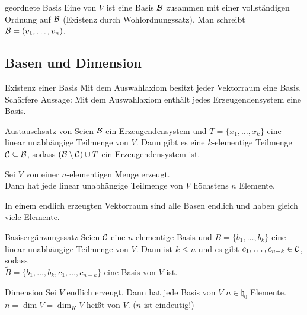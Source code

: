 \begin{Def}{geordnete Basis}
    Eine  von $V$ ist eine Basis $\mathcal{B}$
    zusammen mit einer vollständigen Ordnung auf $\mathcal{B}$
    (Existenz durch Wohlordnungssatz).
    Man schreibt $\mathcal{B} = (v_1, \ldots, v_n)$.
\end{Def}

\subsection{%
    Basen und Dimension%
}

\begin{Satz}{Existenz einer Basis}
    Mit dem Auswahlaxiom besitzt jeder Vektorraum eine Basis. \\
    Schärfere Aussage: Mit dem Auswahlaxiom enthält jedes Erzeugendensystem
    eine Basis.
\end{Satz}

\begin{Satz}{Austauschsatz von }
    Seien $\mathcal{B}$ ein Erzeugendensystem und $T = \{x_1, \ldots, x_k\}$
    eine linear unabhängige Teilmenge von $V$.
    Dann gibt es eine $k$-elementige Teilmenge
    $\mathcal{C} \subseteq \mathcal{B}$, sodass
    $(\mathcal{B} \setminus \mathcal{C}) \cup T$ ein Erzeugendensystem ist.
\end{Satz}

\begin{Kor}
    Sei $V$ von einer $n$-elementigen Menge erzeugt. \\
    Dann hat jede linear unabhängige Teilmenge von $V$ höchstens $n$ Elemente.
\end{Kor}

\begin{Kor}
    In einem endlich erzeugten Vektorraum sind alle Basen endlich und haben
    gleich viele Elemente.
\end{Kor}

\begin{Satz}{Basisergänzungssatz}
    Seien $\mathcal{C}$ eine $n$-elementige Basis und
    $B = \{b_1, \ldots, b_k\}$ eine linear unabhängige Teilmenge von $V$.
    Dann ist $k \le n$ und es gibt $c_1, \ldots, c_{n-k} \in \mathcal{C}$,
    sodass \\
    $\tilde{B} = \{b_1, \ldots, b_k, c_1, \ldots, c_{n-k}\}$ eine Basis von
    $V$ ist.
\end{Satz}

\begin{Def}{Dimension}
    Sei $V$ endlich erzeugt.
    Dann hat jede Basis von $V$ $n \in \natural_0$ Elemente. \\
    $n = \dim V = \dim_K V$ heißt  von $V$.
    ($n$ ist eindeutig!)
\end{Def}

